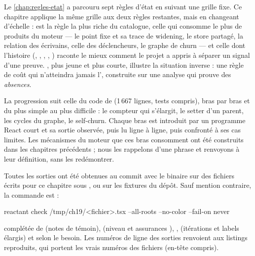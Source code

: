 
Le \cref{chap:regles-etat} a parcouru sept règles d'état en suivant une grille fixe. Ce chapitre applique la même grille aux deux règles restantes, mais en changeant d'échelle :  est la règle la plus riche du catalogue, celle qui consomme le plus de produits du moteur --- le point fixe et sa trace de widening, le store partagé, la relation des écrivains, celle des déclencheurs, le graphe de churn --- et celle dont l'histoire (, , , , ) raconte le mieux comment le projet a appris à séparer un signal d'une preuve. , plus jeune et plus courte, illustre la situation inverse : une règle de coût qui n'atteindra jamais l'\Error, construite sur une analyse qui prouve des \emph{absences}.

La progression suit celle du code de  (1\,667 lignes, tests compris), bras par bras et du plus simple au plus difficile : le compteur qui s'élargit, le setter d'un parent, les cycles du graphe, le self-churn. Chaque bras est introduit par un programme React court et sa sortie observée, puis lu ligne à ligne, puis confronté à ses cas limites. Les mécanismes du moteur que ces bras consomment ont été construits dans les chapitres précédents ; nous les rappelons d'une phrase et renvoyons à leur définition, sans les redémontrer.

Toutes les sorties ont été obtenues au commit \snapshotCommit{} avec le binaire  sur des fichiers écrits pour ce chapitre sous , ou sur les fixtures du dépôt. Sauf mention contraire, la commande est :

\begin{shell}
reactant check /tmp/ch19/<fichier>.tsx --all-roots --no-color --fail-on never
\end{shell}

\noindent complétée de  (notes de témoin),  (niveau \Info{} et assurances ), ,  (itérations et labels élargis) et  selon le besoin. Les numéros de ligne des sorties renvoient aux listings reproduits, qui portent les vrais numéros des fichiers (en-tête  compris).

